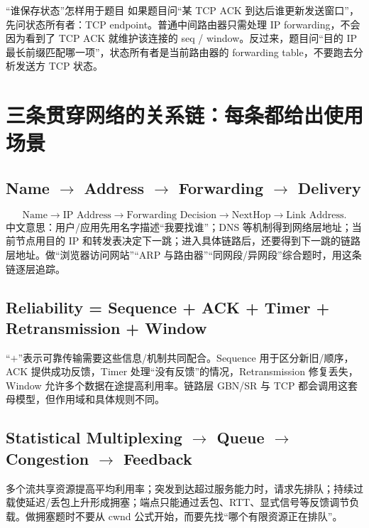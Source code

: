 \documentclass[11pt,a4paper,openany]{ctexbook}
\begin{document}
\begin{methodbox}{“谁保存状态”怎样用于题目}
如果题目问“某 TCP ACK 到达后谁更新发送窗口”，先问状态所有者：TCP endpoint。普通中间路由器只需处理 IP forwarding，不会因为看到了 TCP ACK 就维护该连接的 seq / window。反过来，题目问“目的 IP 最长前缀匹配哪一项”，状态所有者是当前路由器的 forwarding table，不要跑去分析发送方 TCP 状态。
\end{methodbox}

\section{三条贯穿网络的关系链：每条都给出使用场景}
\subsection{\texorpdfstring{Name $\rightarrow$ Address $\rightarrow$ Forwarding $\rightarrow$ Delivery}{Name -> Address -> Forwarding -> Delivery}}
\[
\boxed{\text{Name}\rightarrow\text{IP Address}\rightarrow\text{Forwarding Decision}\rightarrow\text{NextHop}\rightarrow\text{Link Address}}.
\]
中文意思：用户/应用先用名字描述“我要找谁”；DNS 等机制得到网络层地址；当前节点用目的 IP 和转发表决定下一跳；进入具体链路后，还要得到下一跳的链路层地址。做“浏览器访问网站”“ARP 与路由器”“同网段/异网段”综合题时，用这条链逐层追踪。

\subsection{Reliability = Sequence + ACK + Timer + Retransmission + Window}
“$+$”表示可靠传输需要这些信息/机制共同配合。Sequence 用于区分新旧/顺序，ACK 提供成功反馈，Timer 处理“没有反馈”的情况，Retransmission 修复丢失，Window 允许多个数据在途提高利用率。链路层 GBN/SR 与 TCP 都会调用这套母模型，但作用域和具体规则不同。

\subsection{\texorpdfstring{Statistical Multiplexing $\rightarrow$ Queue $\rightarrow$ Congestion $\rightarrow$ Feedback}{Statistical Multiplexing -> Queue -> Congestion -> Feedback}}
多个流共享资源提高平均利用率；突发到达超过服务能力时，请求先排队；持续过载使延迟/丢包上升形成拥塞；端点只能通过丢包、RTT、显式信号等反馈调节负载。做拥塞题时不要从 cwnd 公式开始，而要先找“哪个有限资源正在排队”。
\end{document}
